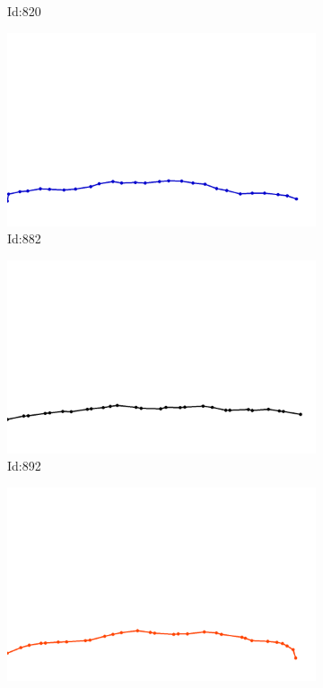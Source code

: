 \documentclass[12pt,twoside]{report}
\begin{document}
\begin{figure}
\begin{subfigure}[b]{0.20\textwidth}
\caption{Id:820}
\end{subfigure}
\begin{subfigure}[b]{0.20\textwidth}
\centering
\includegraphics[width=\textwidth]{../../trajectories/882.png}
\caption{Id:882}
\end{subfigure}
\begin{subfigure}[b]{0.20\textwidth}
\centering
\includegraphics[width=\textwidth]{../../trajectories/892.png}
\caption{Id:892}
\end{subfigure}
\begin{subfigure}[b]{0.20\textwidth}
\centering
\includegraphics[width=\textwidth]{../../trajectories/926.png}

\end{subfigure}
\end{figure}
\end{document}
